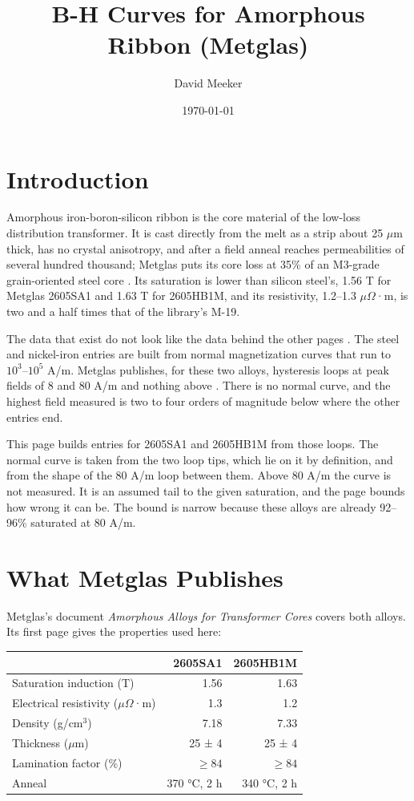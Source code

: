 \documentclass[
  11pt,
]{article}
\title{B-H Curves for Amorphous Ribbon (Metglas)}
\author{David Meeker}
\date{\today}
\begin{document}
\maketitle

\section{Introduction}\label{introduction}

Amorphous iron-boron-silicon ribbon is the core material of the low-loss distribution transformer. It is cast directly from the melt as a strip about 25 \(\mu\)m thick, has no crystal anisotropy, and after a field anneal reaches permeabilities of several hundred thousand; Metglas puts its core loss at 35\% of an M3-grade grain-oriented steel core \cite{metglas-power}. Its saturation is lower than silicon steel's, 1.56 T for Metglas 2605SA1 and 1.63 T for 2605HB1M, and its resistivity, 1.2--1.3 \(\mu\Omega\)·m, is two and a half times that of the library's M-19.

The data that exist do not look like the data behind the other pages \cite{meeker-lowcarbon,meeker-nife}. The steel and nickel-iron entries are built from normal magnetization curves that run to \(10^{3}\)--\(10^{5}\) A/m. Metglas publishes, for these two alloys, hysteresis loops at peak fields of 8 and 80 A/m and nothing above \cite{metglas2011}. There is no normal curve, and the highest field measured is two to four orders of magnitude below where the other entries end.

This page builds entries for 2605SA1 and 2605HB1M from those loops. The normal curve is taken from the two loop tips, which lie on it by definition, and from the shape of the 80 A/m loop between them. Above 80 A/m the curve is not measured. It is an assumed tail to the given saturation, and the page bounds how wrong it can be. The bound is narrow because these alloys are already 92--96\% saturated at 80 A/m.

\section{What Metglas Publishes}\label{what-metglas-publishes}

Metglas's document \emph{Amorphous Alloys for Transformer Cores} \cite{metglas2011} covers both alloys. Its first page gives the properties used here:

\begin{center}
\begin{tabular}{lrr}
\toprule
& 2605SA1 & 2605HB1M \\
\midrule
Saturation induction (T) & 1.56 & 1.63 \\
Electrical resistivity (\(\mu\Omega\)·m) & 1.3 & 1.2 \\
Density (g/cm\(^{3}\)) & 7.18 & 7.33 \\
Thickness (\(\mu\)m) & 25 ± 4 & 25 ± 4 \\
Lamination factor (\%) & \(\ge 84\) & \(\ge 84\) \\
Anneal & 370 °C, 2 h & 340 °C, 2 h \\
\bottomrule
\end{tabular}
\end{center}
\end{document}
